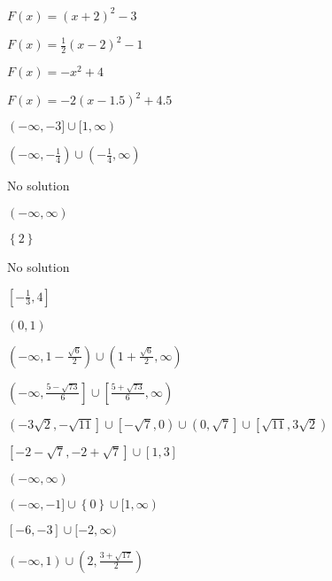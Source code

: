\begin{shortexenum}
\item $F(x) = (x+2)^2-3$  
\item $F(x) = \frac{1}{2}(x-2)^2-1$
\item $F(x) = -x^2+4$  
\item $F(x) =-2(x-1.5)^2+4.5$
\item $(-\infty, -3] \cup [1, \infty)$
\item  $\left(-\infty, -\frac{1}{4}\right) \cup \left(-\frac{1}{4}, \infty \right)$
\item  No solution
\item  $(-\infty, \infty)$
\item  $\left\{2 \right\}$
\item No solution
\item $\left[-\frac{1}{3}, 4 \right]$
\item $(0, 1)$
\item  $\left(-\infty, 1-\frac{\sqrt{6}}{2} \right) \cup \left(1+\frac{\sqrt{6}}{2}, \infty \right)$
\item  $\left(-\infty, \frac{5 - \sqrt{73}}{6} \right] \cup \left[\frac{5 + \sqrt{73}}{6}, \infty \right)$
\item {\scriptsize $\left(-3\sqrt{2}, -\sqrt{11} \right] \cup \left[-\sqrt{7}, 0 \right) \cup \left(0, \sqrt{7} \right] \cup \left[\sqrt{11}, 3\sqrt{2} \right)$}
\item $\left[-2-\sqrt{7}, -2+\sqrt{7} \right] \cup [1, 3]$
\item $(-\infty, \infty)$
\item  $(-\infty, -1] \cup \left\{ 0 \right\} \cup [1,\infty)$
\item  $[-6,-3] \cup [-2, \infty)$
\item  $(-\infty, 1) \cup \left(2, \frac{3+\sqrt{17}}{2}\right)$

\end{shortexenum}

